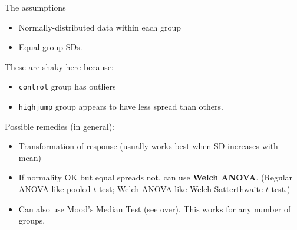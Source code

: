 \documentclass[unknownkeysallowed]{beamer}\usepackage[]{graphicx}\usepackage[]{color}
\begin{document}
\begin{frame}[fragile]{The assumptions}

  \begin{itemize}
  \item Normally-distributed data within each group
  \item Equal group SDs.
  \end{itemize}

These are shaky here because:

\begin{itemize}
\item \texttt{control} group has outliers
\item \texttt{highjump} group appears to have less spread than others.
\end{itemize}

Possible remedies (in general):

\begin{itemize}
\item Transformation of response (usually works best when SD increases
  with mean)
\item If normality OK but equal spreads not, can use \textbf{Welch
    ANOVA}. (Regular ANOVA like pooled $t$-test; Welch ANOVA like
  Welch-Satterthwaite $t$-test.)
\item Can also use Mood's Median Test (see over). This works for any
  number of groups.
\end{itemize}

\end{frame}
\end{document}
